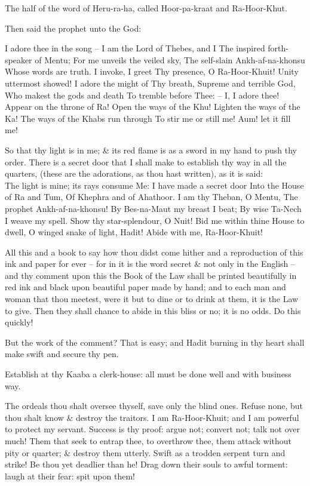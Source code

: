 The half of the word of Heru-ra-ha, called Hoor-pa-kraat and Ra-Hoor-Khut.

Then said the prophet unto the God:

I adore thee in the song --
I am the Lord of Thebes, and I
The inspired forth-speaker of Mentu;
For me unveils the veiled sky,
The self-slain Ankh-af-na-khonsu
Whose words are truth. I invoke, I greet
Thy presence, O Ra-Hoor-Khuit!
Unity uttermost showed!
I adore the might of Thy breath,
Supreme and terrible God,
Who makest the gods and death
To tremble before Thee: --
I, I adore thee!
Appear on the throne of Ra!
Open the ways of the Khu!
Lighten the ways of the Ka!
The ways of the Khabs run through
To stir me or still me!
Aum! let it fill me!

So that thy light is in me; \& its red flame is as a sword in my hand to push thy order. There is a secret door that I shall make to establish thy way in all the quarters, (these are the adorations, as thou hast written), as it is said:
\\
The light is mine; its rays consume
Me: I have made a secret door
Into the House of Ra and Tum,
Of Khephra and of Ahathoor.
I am thy Theban, O Mentu,
The prophet Ankh-af-na-khonsu!
By Bes-na-Maut my breast I beat;
By wise Ta-Nech I weave my spell.
Show thy star-splendour, O Nuit!
Bid me within thine House to dwell,
O winged snake of light, Hadit!
Abide with me, Ra-Hoor-Khuit!

All this and a book to say how thou didst come hither and a reproduction of this ink and paper for ever -- for in it is the word secret \& not only in the English -- and thy comment upon this the Book of the Law shall be printed beautifully in red ink and black upon beautiful paper made by hand; and to each man and woman that thou meetest, were it but to dine or to drink at them, it is the Law to give. Then they shall chance to abide in this bliss or no; it is no odds. Do this quickly!

But the work of the comment? That is easy; and Hadit burning in thy heart shall make swift and secure thy pen.

Establish at thy Kaaba a clerk-house: all must be done well and with business way.

The ordeals thou shalt oversee thyself, save only the blind ones. Refuse none, but thou shalt know \& destroy the traitors. I am Ra-Hoor-Khuit; and I am powerful to protect my servant. Success is thy proof: argue not; convert not; talk not over much! Them that seek to entrap thee, to overthrow thee, them attack without pity or quarter; \& destroy them utterly. Swift as a trodden serpent turn and strike! Be thou yet deadlier than he! Drag down their souls to awful torment: laugh at their fear: spit upon them!

